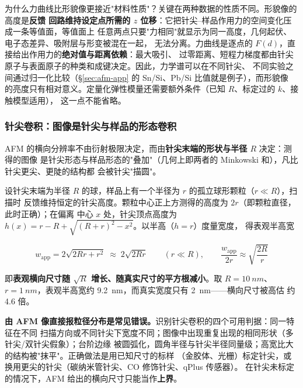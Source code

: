 为什么力曲线比形貌像更接近"材料性质"？关键在两种数据的性质不同。形貌像的高度是\textbf{反馈
回路维持设定点所需的 $z$ 位移}：它把针尖--样品作用力的空间变化压成一条等值面，等值面上
任意两点只要"力相同"就显示为同一高度，几何起伏、电子态差异、吸附层与形变被混在一起，
无法分离。力曲线是逐点的 $F(d)$，直接给出作用力的\textbf{绝对值与距离依赖}：最大吸引、
过零距离、短程力梯度都由针尖原子与表面原子的种类和成键决定。因此，力学谱可以在不同针尖、
不同实验之间通过归一化比较（§\ref{sec:afm-app} 的 Sn/Si、Pb/Si 比值就是例子），而形貌像
的亮度只有相对意义。定量化弹性模量还需要额外条件（已知 $R$、标定过的 $k$、接触模型适用），
这一点不能省略。

\subsubsection{针尖卷积：图像是针尖与样品的形态卷积}
\label{sec:afm-conv}

AFM 的横向分辨率不由衍射极限决定，而由\textbf{针尖末端的形状与半径 $R$} 决定：测得的图像
是针尖形态与样品形态的"叠加"（几何上即两者的 Minkowski 和），凡比针尖更尖、更陡的结构都
会被针尖"描圆"。

\begin{principle}
设针尖末端为半径 $R$ 的球，样品上有一个半径为 $r$ 的孤立球形颗粒（$r\ll R$），扫描时
反馈维持恒定的针尖高度。颗粒中心正上方测得的高度为 $2r$（即颗粒直径，此时正确）；在偏离
中心 $x$ 处，针尖顶点高度为 $h(x)=r-R+\sqrt{(R+r)^{2}-x^{2}}$。以半高（$h=r$）度量宽度，
得表观半高宽
\end{principle}

\begin{equation}\label{eq:tipconv}
w_{\mathrm{app}}=2\sqrt{2Rr+r^{2}}\;\approx\;2\sqrt{2Rr}\qquad(r\ll R),
\qquad
\frac{w_{\mathrm{app}}}{2r}\approx\sqrt{\frac{2R}{r}}
\end{equation}

即\textbf{表观横向尺寸随 $\sqrt{R}$ 增长、随真实尺寸的平方根减小}。取 $R=\qty{10}{nm}$、
$r=\qty{1}{nm}$，表观半高宽约 \qty{9.2}{nm}，而真实宽度只有 \qty{2}{nm}——横向尺寸被高估
约 4.6 倍。


\begin{pitfall}
\textbf{由 AFM 像直接报粒径分布是常见错误。}识别针尖卷积的四个可用判据：同一特征在不同
扫描方向或不同针尖下宽度不同；图像中出现重复出现的相同形状（多针尖/双针尖假象）；台阶边缘
被圆弧化，圆角半径与针尖半径同量级；高宽比大的结构被"抹平"。正确做法是用已知尺寸的标样
（金胶体、光栅）标定针尖，或换用更尖的针尖（碳纳米管针尖、CO 修饰针尖、qPlus 传感器）。
在针尖未标定的情况下，AFM 给出的横向尺寸只能当作\textbf{上界}。
\end{pitfall}

